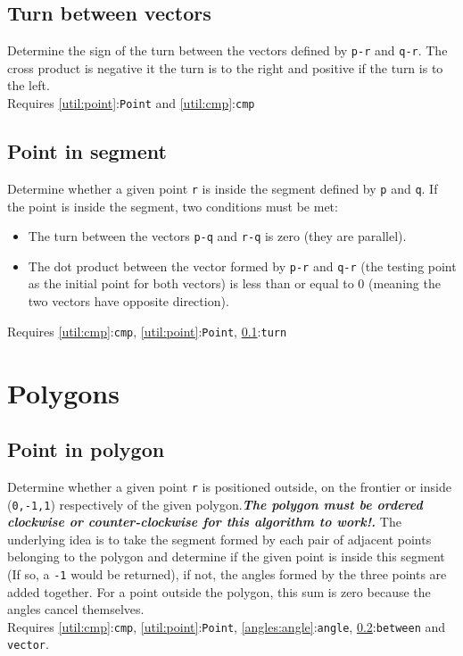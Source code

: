 \documentclass[11pt, oneside]{article}   	%
\begin{document}

\subsection{Turn between vectors}\label{angles:turn}
	Determine the sign of the turn between the vectors defined by \verb|p-r| and \verb|q-r|. The cross product is negative it the turn is to the right and positive if the turn is to the left.\\
	 Requires \ref{util:point}:\verb|Point| and \ref{util:cmp}:\verb|cmp|

\subsection{Point in segment}\label{angles:piseg}	

	Determine whether a given point \verb|r| is inside the segment defined by \verb|p| and \verb|q|. If the point is inside the segment, two conditions must be met:
	\begin{itemize}
		\item The turn between the vectors \verb|p-q| and \verb|r-q| is zero (they are parallel).
		\item The dot product between the vector formed by \verb|p-r| and \verb|q-r| (the testing point as the initial point for both vectors) is less than or equal to $0$ (meaning the two vectors have opposite direction).
	\end{itemize}
Requires \ref{util:cmp}:\verb|cmp|, \ref{util:point}:\verb|Point|, \ref{angles:turn}:\verb|turn|
\section{Polygons}

\subsection{Point in polygon}\label{poly:pipoly}	
	Determine whether a given point \verb|r| is positioned outside, on the frontier or inside (\verb|0,-1,1|) respectively of the given polygon.\textbf{\textit{The polygon must be ordered clockwise or counter-clockwise for this algorithm to work!.}} The underlying idea is to take the segment formed by each pair of adjacent points belonging to the polygon and determine if the given point is inside this segment (If so, a \verb|-1| would be returned), if not, the angles formed by the three points are added together. For a point outside the polygon, this sum is zero because the angles cancel themselves. \\
	Requires \ref{util:cmp}:\verb|cmp|, \ref{util:point}:\verb|Point|, \ref{angles:angle}:\verb|angle|, \ref{angles:piseg}:\verb|between| and \verb|vector|.
	
\end{document}
